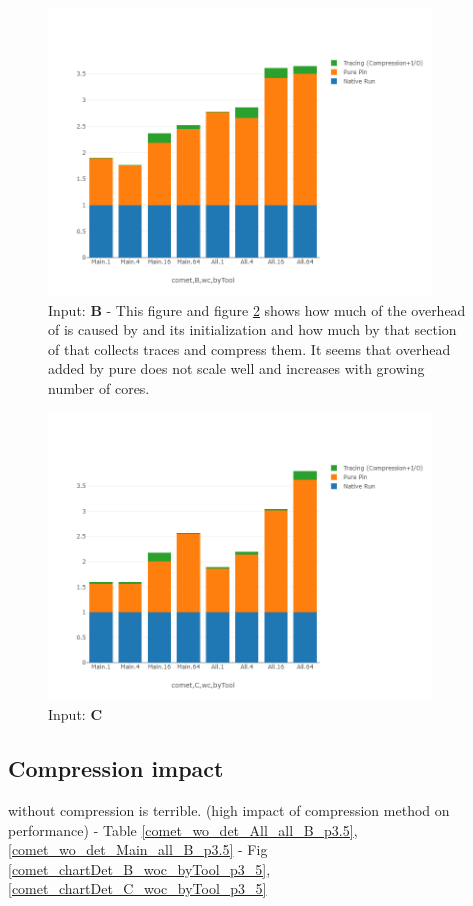\begin{figure}[!t]
\centering
\includegraphics[width=4in]{figs.comet.newMed/comet_chartDet_B_wc_byTool_p3_5.png}
\caption{ Input: \textbf{B} - This figure and figure \ref{comet_chartDet_C_wc_byTool_p3_5} shows how much of the overhead of \parlot is caused by \pin and its initialization and how much by that section of \parlot that collects traces and compress them. It seems that overhead added by pure \pin does not scale well and increases with growing number of cores.
}
\label{comet_chartDet_B_wc_byTool_p3_5}
\end{figure}


\begin{figure}[!t]
\centering
\includegraphics[width=4in]{figs.comet.newMed/comet_chartDet_C_wc_byTool_p3_5.png}
\caption{ Input: \textbf{C}
}
\label{comet_chartDet_C_wc_byTool_p3_5}
\end{figure}






\subsection{Compression impact} 
\label{subsec:compact}
\parlot without compression is terrible. (high impact of compression method on performance)
 - Table \ref{comet_wo_det_All_all_B_p3.5}, \ref{comet_wo_det_Main_all_B_p3.5}
   - Fig \ref{comet_chartDet_B_woc_byTool_p3_5}, \ref{comet_chartDet_C_woc_byTool_p3_5}
   

